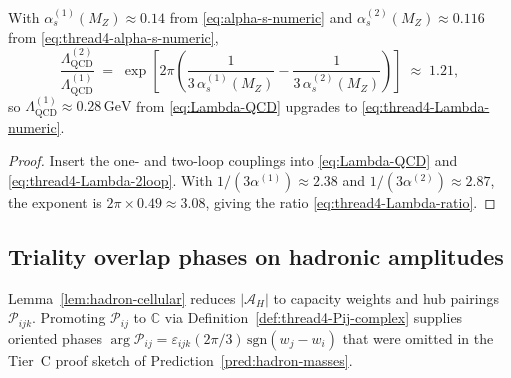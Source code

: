 \begin{lemma}
\label{lem:thread4-Lambda-shift}
With $\alpha_s^{(1)}(M_Z)\approx 0.14$ from \eqref{eq:alpha-s-numeric} and
$\alpha_s^{(2)}(M_Z)\approx 0.116$ from \eqref{eq:thread4-alpha-s-numeric},
\begin{equation}\label{eq:thread4-Lambda-ratio}
  \frac{\Lambda_{\mathrm{QCD}}^{(2)}}{\Lambda_{\mathrm{QCD}}^{(1)}}
  \;=\;
  \exp\!\left[
    2\pi\left(
      \frac{1}{3\,\alpha_s^{(1)}(M_Z)}
      -
      \frac{1}{3\,\alpha_s^{(2)}(M_Z)}
    \right)
  \right]
  \;\approx\;
  1.21,
\end{equation}
so $\Lambda_{\mathrm{QCD}}^{(1)}\approx 0.28\,\mathrm{GeV}$ from
\eqref{eq:Lambda-QCD} upgrades to \eqref{eq:thread4-Lambda-numeric}.
\end{lemma}

\begin{proof}
Insert the one- and two-loop couplings into \eqref{eq:Lambda-QCD} and
\eqref{eq:thread4-Lambda-2loop}. With
$1/(3\alpha^{(1)})\approx 2.38$ and $1/(3\alpha^{(2)})\approx 2.87$,
the exponent is $2\pi\times 0.49\approx 3.08$, giving the ratio
\eqref{eq:thread4-Lambda-ratio}.
\end{proof}

\subsection{Triality overlap phases on hadronic amplitudes}
\label{sec:wave2-thread4:phases}

Lemma~\ref{lem:hadron-cellular} reduces $|\mathcal{A}_H|$ to capacity
weights and hub pairings $\mathcal{P}_{ijk}$. Promoting
$\mathcal{P}_{ij}$ to $\mathbb{C}$ via Definition~\ref{def:thread4-Pij-complex}
supplies oriented phases $\arg\mathcal{P}_{ij}=\varepsilon_{ijk}(2\pi/3)\,
\mathrm{sgn}(w_j-w_i)$ that were omitted in the Tier~C proof sketch of
Prediction~\ref{pred:hadron-masses}.

